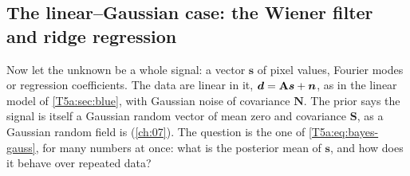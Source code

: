 \subsection{The linear--Gaussian case: the Wiener filter and ridge regression}
\label{T5a:sec:wiener}

Now let the unknown be a whole signal: a vector $\bm s$ of pixel values,
Fourier modes or regression coefficients. The data are linear in it,
$\bm{d}=\mathbf A\bm s+\bm n$, as in the linear model of \cref{T5a:sec:blue},
with Gaussian noise of covariance $\mathbf N$. The prior says the signal is
itself a Gaussian random vector of mean zero and covariance $\mathbf S$, as a
Gaussian random field is (\cref{ch:07}). The question is the one of
\eqref{T5a:eq:bayes-gauss}, for many numbers at once: what is the posterior
mean of $\bm s$, and how does it behave over repeated data?

